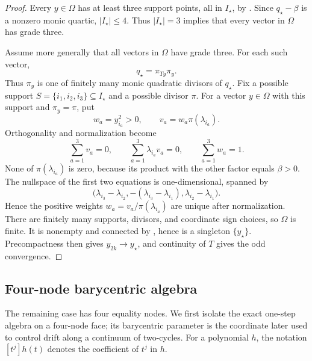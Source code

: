 \documentclass[11pt]{article}
\begin{document}
\begin{proof}
Every \(y\in\Omega\) has at least three support points, all in
\(I_\star\), by
.  Since
\(q_\star-\beta\) is a nonzero monic quartic,
\(\lvert I_\star\rvert\leq4\).  Thus
\(\lvert I_\star\rvert=3\) implies that every vector in \(\Omega\) has
grade three.

Assume more generally that all vectors in \(\Omega\) have grade three.
For each such vector,
\[
 q_\star=\pi_{Ty}\pi_y.
\]
Thus \(\pi_y\) is one of finitely many monic quadratic divisors of
\(q_\star\).  Fix a possible support
\(S=\{i_1,i_2,i_3\}\subseteq I_\star\) and a possible divisor \(\pi\).
For a vector \(y\in\Omega\) with this support and \(\pi_y=\pi\), put
\[
 w_a=y_{i_a}^2>0,\qquad v_a=w_a\pi(\lambda_{i_a}).
\]
Orthogonality and normalization become
\[
 \sum_{a=1}^3v_a=0,\qquad
 \sum_{a=1}^3\lambda_{i_a}v_a=0,\qquad
 \sum_{a=1}^3w_a=1.
\]
None of \(\pi(\lambda_{i_a})\) is zero, because its product with the other
factor equals \(\beta>0\).  The nullspace of the first two equations is
one-dimensional, spanned by
\[
 \bigl(\lambda_{i_3}-\lambda_{i_2},
       -(\lambda_{i_3}-\lambda_{i_1}),
       \lambda_{i_2}-\lambda_{i_1}\bigr).
\]
Hence the positive weights \(w_a=v_a/\pi(\lambda_{i_a})\) are unique after
normalization.  There are finitely many supports, divisors, and coordinate
sign choices, so \(\Omega\) is finite.  It is nonempty and connected by
, hence is a singleton \(\{y_\star\}\).
Precompactness then gives \(y_{2k}\to y_\star\), and continuity of \(T\)
gives the odd convergence.
\end{proof}

\subsection{Four-node barycentric algebra}

The remaining case has four equality nodes.  We first isolate the exact
one-step algebra on a four-node face; its barycentric parameter is the
coordinate later used to control drift along a continuum of two-cycles.
For a polynomial \(h\), the notation \([t^j]h(t)\) denotes the coefficient
of \(t^j\) in \(h\).
\end{document}
